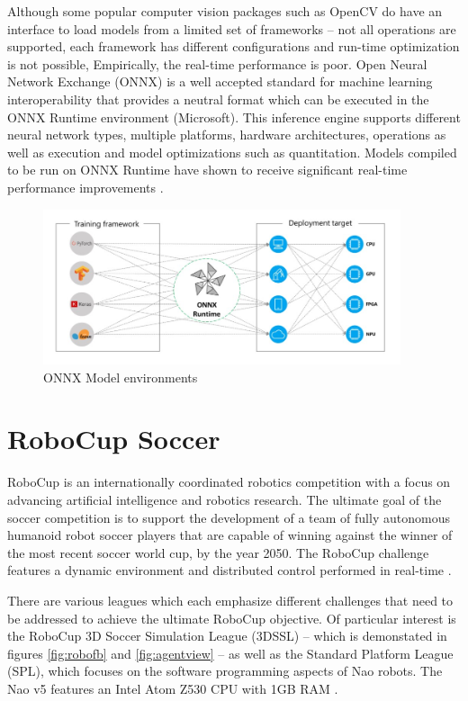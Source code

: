 \documentclass[a4paper,twoside,12pt]{report}
\begin{document}
Although some popular computer vision packages such as OpenCV do have an interface to load models from a limited set of frameworks -- not all operations are supported, each framework has different configurations and run-time optimization is not possible, Empirically, the real-time performance is poor. Open Neural Network Exchange (ONNX) is a well accepted standard \citep{onnx} for machine learning interoperability that provides a neutral format which can be executed in the ONNX Runtime environment (Microsoft). This inference engine supports different neural network types, multiple platforms, hardware architectures, operations as well as execution and model optimizations such as quantitation. Models compiled to be run on ONNX Runtime have shown to receive significant real-time performance improvements \citep{inference}.

\begin{figure}[h!]
\begin{center}
\includegraphics[width=10.5cm]{images/onnx.jpg}
\caption{ONNX Model environments \citep{onnx}}
\label{fig:onnxplot}
\end{center}
\end{figure}

\section{RoboCup Soccer}
RoboCup is an internationally coordinated robotics competition with a focus on advancing artificial intelligence and robotics research. The ultimate goal of the soccer competition is to support the development of a team of fully autonomous humanoid robot soccer players that are capable of winning against the winner of the most recent soccer world cup, by the year 2050. The RoboCup challenge features a dynamic environment and distributed control performed in real-time \citep{RoboCupObj}.\

There are various leagues which each emphasize different challenges that need to be addressed to achieve the ultimate RoboCup objective. Of particular interest is the RoboCup 3D Soccer Simulation League (3DSSL) -- which is demonstated in figures \ref{fig:robofb} and \ref{fig:agentview} -- as well as the Standard Platform League (SPL), which focuses on the software programming aspects of Nao robots. The Nao v5 features an Intel Atom Z530 CPU with 1GB RAM \citep{naov5}.
\end{document}

